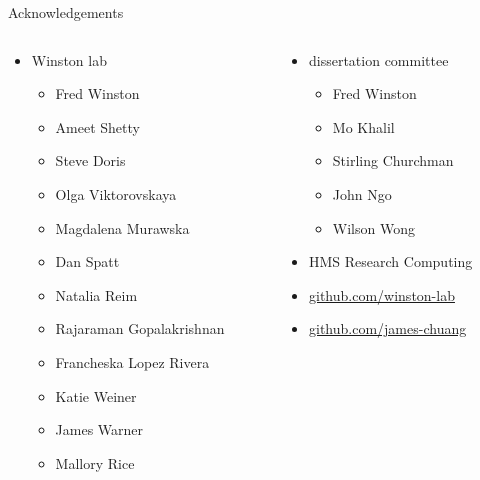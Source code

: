 \documentclass[aspectratio=169, 12pt]{beamer}
\begin{document}
\begin{frame}{Acknowledgements}
    \begin{columns}
        \begin{column}{0.5\textwidth}
            \begin{itemize}[]
                \item Winston lab
                    \begin{itemize}
                        \item Fred Winston
                        \item Ameet Shetty
                        \item Steve Doris
                        \item Olga Viktorovskaya
                        \item Magdalena Murawska
                        \item Dan Spatt
                        \item Natalia Reim
                        \item Rajaraman Gopalakrishnan
                        \item Francheska Lopez Rivera
                        \item Katie Weiner
                        \item James Warner
                        \item Mallory Rice
                    \end{itemize}
            \end{itemize}
        \end{column}
        \begin{column}{0.5\textwidth}
            \begin{itemize}
                \item dissertation committee
                    \begin{itemize}[]
                        \item Fred Winston
                        \item Mo Khalil
                        \item Stirling Churchman
                        \item John Ngo
                        \item Wilson Wong
                    \end{itemize}
                \item HMS Research Computing
            \end{itemize}
            \begin{itemize}
                \item \href{https://github.com/winston-lab}{github.com/winston-lab}
                \item \href{https://github.com/james-chuang}{github.com/james-chuang}
            \end{itemize}
        \end{column}
    \end{columns}
\end{frame}
\end{document}
